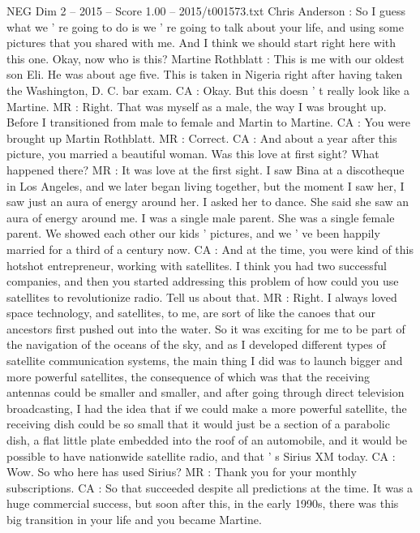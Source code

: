 \begin{textsample}{NEG Dim 2 – 2015 – Score 1.00 – 2015/t001573.txt}  \label{ex:f2_neg_040}
Chris Anderson : So I guess what we ' re going to do is we ' re going to talk about your life, and using some pictures that you shared with me.
And I think we should start right here with this one.
Okay, now who is this?
Martine Rothblatt : This is me with our oldest son Eli.
He was about age five.
This is taken in Nigeria right after having taken the Washington, D.
C. bar exam.
CA : Okay.
But this doesn ' t really look like a Martine.
MR : Right.
That was myself as a male, the way I was brought up.
Before I transitioned from male to female and Martin to Martine.
CA : You were brought up Martin Rothblatt.
MR : Correct.
CA : And about a year after this picture, you married a beautiful woman.
Was this love at first sight?
What happened there?
MR : It was love at the first sight.
I saw Bina at a discotheque in Los Angeles, and we later began living together, but the moment I saw her, I saw just an aura of energy around her.
I asked her to dance.
She said she saw an aura of energy around me.
I was a single male parent.
She was a single female parent.
We showed each other our kids ' pictures, and we ' ve been happily married for a third of a century now.
CA : And at the time, you were kind of this hotshot entrepreneur, working with satellites.
I think you had two successful companies, and then you started addressing this problem of how could you use satellites to revolutionize radio.
Tell us about that.
MR : Right.
I always loved space technology, and satellites, to me, are sort of like the canoes that our ancestors first pushed out into the water.
So it was exciting for me to be part of the navigation of the oceans of the sky, and as I developed different types of satellite communication systems, the main thing I did was to launch bigger and more powerful satellites, the consequence of which was that the receiving antennas could be smaller and smaller, and after going through direct television broadcasting, I had the idea that if we could make a more powerful satellite, the receiving dish could be so small that it would just be a section of a parabolic dish, a flat little plate embedded into the roof of an automobile, and it would be possible to have nationwide satellite radio, and that ' s Sirius XM today.
CA : Wow.
So who here has used Sirius?
MR : Thank you for your monthly subscriptions.
CA : So that succeeded despite all predictions at the time.
It was a huge commercial success, but soon after this, in the early 1990s, there was this big transition in your life and you became Martine.

\end{textsample}
